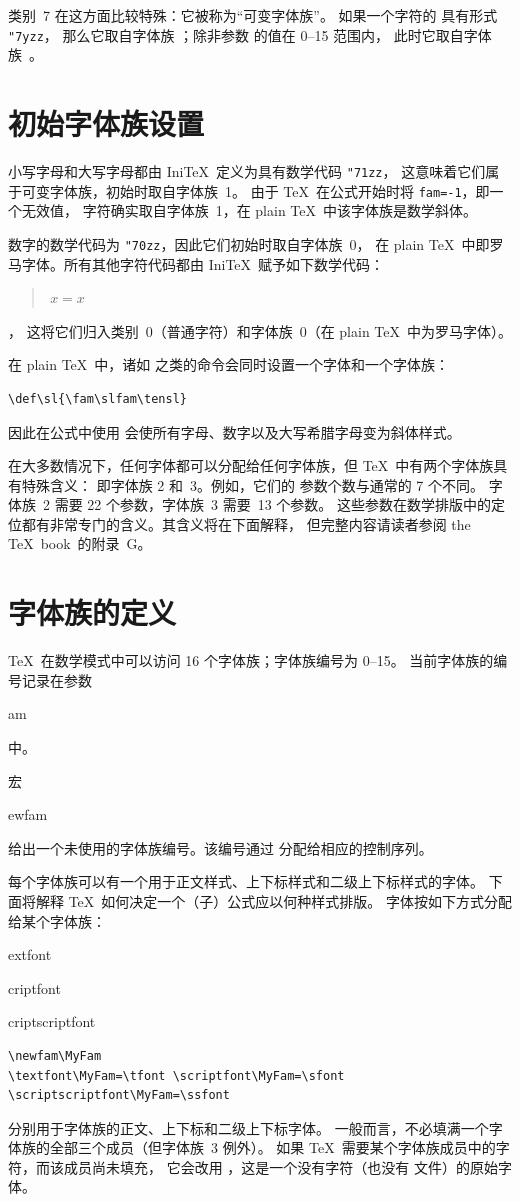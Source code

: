 \documentclass[a4paper]{rapport3}
\makeatletter
\def\IniTeX{Ini\TeX}\def\LamsTeX{LAMS\TeX}\def\VirTeX{Vir\TeX}
\def\TeXbook{the \TeX\ book}\def\web{{\sc web}}
\newenvironment{disp}{\begin{quotation}}{\end{quotation}}
\def\cstoidx#1\par{\index{#1@\cs{#1}}}
\def\csidx#1{\cstoidx #1\par\cs{#1}}
\makeatother
\begin{document}
类别~7 在这方面比较特殊：它被称为“可变字体族”。
如果一个字符的  具有形式 \verb."7yzz.，
那么它取自字体族 ；除非参数  的值在 0--15 范围内，
此时它取自字体族~。


\section{初始字体族设置}

小写字母和大写字母都由 \IniTeX\ 定义为具有数学代码 \verb>"71zz>，
\label{ini:fam}%
这意味着它们属于可变字体族，初始时取自字体族~1。
由于 \TeX\ 在公式开始时将 \verb.fam=-1.，即一个无效值，
字符确实取自字体族~1，在 plain \TeX\ 中该字体族是数学斜体。

数字的数学代码为 \verb>"70zz>，因此它们初始时取自字体族~0，
在 plain \TeX\ 中即罗马字体。所有其他字符代码都由 \IniTeX\ 赋予如下数学代码：
\begin{disp}$\,x=x$\end{disp}，
这将它们归入类别~0（普通字符）和字体族~0（在 plain \TeX\ 中为罗马字体）。

在 plain \TeX\ 中，诸如  之类的命令会同时设置一个字体和一个字体族：
\begin{verbatim}
\def\sl{\fam\slfam\tensl}
\end{verbatim}
因此在公式中使用  会使所有字母、数字以及大写希腊字母变为斜体样式。

在大多数情况下，任何字体都可以分配给任何字体族，但 \TeX\ 中有两个字体族具有特殊含义：
即字体族 2 和~3。例如，它们的  参数个数与通常的 7 个不同。
字体族~2 需要 22 个参数，字体族~3 需要~13 个参数。
这些参数在数学排版中的定位都有非常专门的含义。其含义将在下面解释，
但完整内容请读者参阅 \TeXbook\ 的附录~G。


\section{字体族的定义}

\TeX\ 在数学模式中可以访问 16 个字体族；字体族编号为 0--15。
当前字体族的编号记录在参数~\csidx{fam} 中。

宏 \csidx{newfam} 给出一个未使用的字体族编号。该编号通过 
分配给相应的控制序列。


每个字体族可以有一个用于正文样式、上下标样式和二级上下标样式的字体。
下面将解释 \TeX\ 如何决定一个（子）公式应以何种样式排版。
字体按如下方式分配给某个字体族：
\cstoidx textfont\par\cstoidx scriptfont\par\cstoidx scriptscriptfont\par
\begin{verbatim}
\newfam\MyFam
\textfont\MyFam=\tfont \scriptfont\MyFam=\sfont
\scriptscriptfont\MyFam=\ssfont
\end{verbatim}
分别用于字体族的正文、上下标和二级上下标字体。
一般而言，不必填满一个字体族的全部三个成员（但字体族~3 例外）。
如果 \TeX\ 需要某个字体族成员中的字符，而该成员尚未填充，
它会改用 ，这是一个没有字符（也没有  文件）的原始字体。
\end{document}
